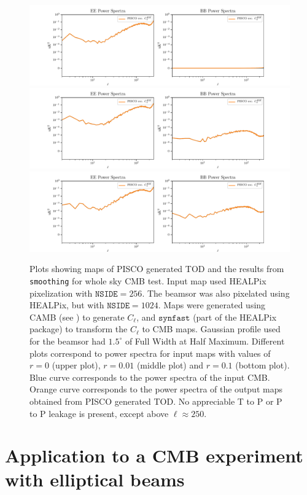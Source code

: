\documentclass[a4paper,fleqn]{cas-dc}\sloppy
\begin{document}
\begin{figure}
	\centering
	\includegraphics[width=1\linewidth]{figures/ps_r0d00.pdf}
	\includegraphics[width=1\linewidth]{figures/ps_r0d01.pdf}
	\includegraphics[width=1\linewidth]{figures/ps_r0d10.pdf}
	\caption{Plots showing maps of PISCO generated TOD and the results from \texttt{smoothing} for whole sky CMB test. Input map used HEALPix pixelization with $\mathrm{\texttt{NSIDE}} = 256$. The beamsor was also pixelated using HEALPix, but with $\mathrm{\texttt{NSIDE}} = 1024$. Maps were generated using CAMB (see \cite{Lewis:2002ah}) to generate $C_\ell$, and $\texttt{synfast}$ (part of the HEALPix package) to transform the $C_\ell$ to CMB maps. Gaussian profile used for the beamsor had $1.5^\circ$ of Full Width at Half Maximum. Different plots correspond to power spectra for input maps with values of $r=0$ (upper plot), $r=0.01$ (middle plot) and $r=0.1$ (bottom plot). Blue curve corresponds to the power spectra of the input CMB. Orange curve corresponds to the power spectra of the output maps obtained from PISCO generated TOD. No appreciable T to P or P to P leakage is present, except above $\ell \approx 250$.}
	\label{fig::pisco4wholesky}
\end{figure}

%
\section{Application to a CMB experiment with elliptical beams}
\label{sec::class_pisco_sim}
\end{document}
